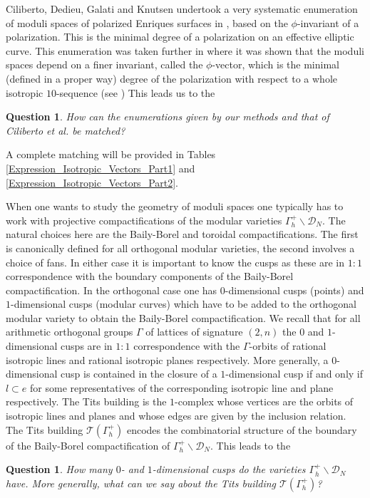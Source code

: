 \documentclass[a4paper,11pt]{article}
\newtheorem{question}[lemma]{Question}
\renewcommand{\cD}{\mathcal D}
\begin{document}
Ciliberto, Dedieu, Galati and Knutsen undertook a very systematic enumeration of moduli spaces of polarized Enriques surfaces in \cite{CDGK}, based on the $\phi$-invariant of a polarization. This is the minimal
degree of a polarization on an effective elliptic curve.
This enumeration was taken further in \cite{Kn} where it was shown that the moduli spaces depend on a finer invariant, called the $\phi$-vector, which is the minimal (defined in a proper way) degree of the
polarization with respect to a whole isotropic $10$-sequence (see \cite[Theorem 1.4]{Kn})
This leads us to the

\begin{question}\label{qu:4}
How can the enumerations given by our methods and that of Ciliberto et al. be matched?
\end{question}

A complete matching will be provided in Tables \ref{Expression_Isotropic_Vectors_Part1} and \ref{Expression_Isotropic_Vectors_Part2}.

When one wants to study the geometry of moduli spaces one typically has to work with projective compactifications of the modular varieties $\Gamma^+_h \backslash \cD_N$.
The natural choices here are the Baily-Borel and
toroidal compactifications. The first is canonically defined for all orthogonal modular varieties, the second involves a choice of fans. In either case it is important to know the cusps
as these are in $1:1$ correspondence with the boundary components of the Baily-Borel compactification. In the orthogonal case one has $0$-dimensional cusps (points) and
$1$-dimensional cusps (modular curves) which have to be added to the orthogonal modular variety to obtain the Baily-Borel compactification.
We recall that  for all arithmetic orthogonal groups $\Gamma$ of lattices of signature $(2,n)$ the $0$ and $1$-dimensional
cusps are in $1:1$ correspondence with the $\Gamma$-orbits of rational isotropic lines and rational isotropic planes respectively.
More generally, a $0$-dimensional cusp is contained in the closure of a $1$-dimensional cusp if and only if $l \subset e$ for some representatives of the corresponding isotropic line and plane respectively.
The Tits building is the $1$-complex whose vertices are the orbits of isotropic lines and planes and whose edges are given by the inclusion relation. The Tits building $\mathcal T (\Gamma^+_h)$ encodes the
combinatorial structure of the boundary of the Baily-Borel compactification of  $\Gamma^+_h \backslash \cD_N$.
This leads to the
\begin{question}\label{qu:5}
How many $0$- and $1$-dimensional cusps do the varieties $\Gamma^+_h \backslash \cD_N$ have. More generally, what can we say about the Tits building $\mathcal T (\Gamma^+_h)$?
\end{question}
\end{document}
